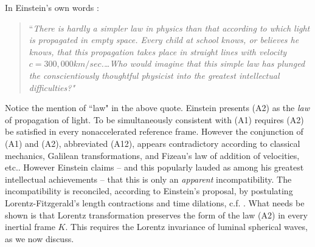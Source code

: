 \documentclass[12pt]{amsart}
\theoremstyle{definition}
\theoremstyle{remark}
\begin{document}
In Einstein's own words \cite[Ch.7, 11]{einstein2019relativity}:

\begin{quote} 
``\emph{There is hardly a simpler law in physics than that according to which light is propagated in empty space. Every child at school knows, or believes he knows, that this propagation takes place in straight lines with velocity $c=300, 000 km/sec$.\ldots Who would imagine that this simple law has plunged the conscientiously thoughtful physicist into the greatest intellectual difficulties?"} 
\end{quote}

Notice the mention of ``law" in the above quote. Einstein presents (A2) as the \emph{law} of propagation of light. To be simultaneously consistent with (A1) requires (A2) be satisfied in every nonaccelerated reference frame. However the conjunction of (A1) and (A2), abbreviated (A12), appears contradictory according to classical mechanics, Galilean transformations, and Fizeau's law of addition of velocities, etc.. However Einstein claims -- and this popularly lauded as among his greatest intellectual achievements -- that this is only an \emph{apparent} incompatibility. The incompatibility is reconciled, according to Einstein's proposal, by postulating Lorentz-Fitzgerald's length contractions and time dilations, c.f. \cite[Ch.XIV]{michelson}. What needs be shown is that Lorentz transformation preserves the form of the law (A2) in every inertial frame $K$. This requires the Lorentz invariance of luminal spherical waves, as we now discuss.   







\end{document}
